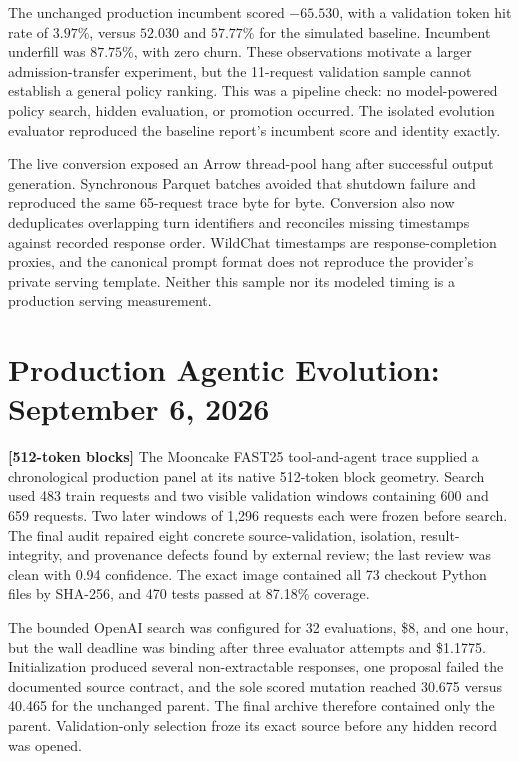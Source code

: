 \documentclass[11pt]{article}
\newcommand{\code}[1]{\texttt{\detokenize{#1}}}
\newcommand{\blocktag}[1]{\textbf{\color{navy}[#1-token blocks]}}
\begin{document}
The unchanged production incumbent scored $-65.530$, with a validation token
hit rate of $3.97\%$, versus $52.030$ and $57.77\%$ for the simulated
\code{vllm_apc} baseline.  Incumbent underfill was $87.75\%$, with zero churn.
These observations motivate a larger admission-transfer experiment, but the
11-request validation sample cannot establish a general policy ranking.  This
was a pipeline check: no model-powered policy search, hidden evaluation, or
promotion occurred.  The isolated evolution evaluator reproduced the baseline
report's incumbent score and identity exactly.

The live conversion exposed an Arrow thread-pool hang after successful output
generation.  Synchronous Parquet batches avoided that shutdown failure and
reproduced the same 65-request trace byte for byte.  Conversion also now
deduplicates overlapping turn identifiers and reconciles missing timestamps
against recorded response order.  WildChat timestamps are response-completion
proxies, and the canonical prompt format does not reproduce the provider's
private serving template.  Neither this sample nor its modeled timing is a
production serving measurement.

\section{Production Agentic Evolution: September 6, 2026}

\blocktag{512} The Mooncake FAST25 tool-and-agent trace supplied a chronological
production panel at its native 512-token block geometry.  Search used 483 train
requests and two visible validation windows containing 600 and 659 requests.
Two later windows of 1,296 requests each were frozen before search.  The final
audit repaired eight concrete source-validation, isolation, result-integrity,
and provenance defects found by external review; the last review was clean with
0.94 confidence.  The exact image contained all 73 checkout Python files by
SHA-256, and 470 tests passed at 87.18\% coverage.

The bounded OpenAI search was configured for 32 evaluations, \$8, and one hour,
but the wall deadline was binding after three evaluator attempts and \$1.1775.
Initialization produced several non-extractable responses, one proposal failed
the documented source contract, and the sole scored mutation reached 30.675
versus 40.465 for the unchanged parent.  The final archive therefore contained
only the parent.  Validation-only selection froze its exact source before any
hidden record was opened.
\end{document}
